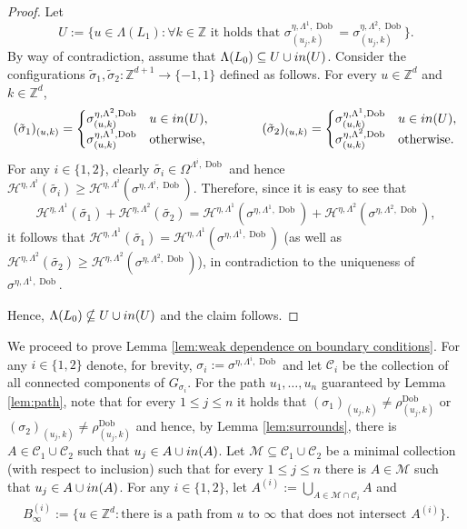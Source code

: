 \documentclass[11pt, reqno]{amsart}
\newcommand{\Z}{\mathbb{Z}}
\DeclareMathOperator{\Dob}{Dob}
\numberwithin{equation}{section}
\begin{document}
\begin{proof}
Let $$U:=\{u\in\Lambda(L_1)\colon\forall k\in{\mathbb Z} \text{ it holds that } \sigma^{\eta,\Lambda^1,\Dob}_{(u_j,k)} =\sigma^{\eta,\Lambda^2,\Dob}_{(u_j,k)}\}.$$
By way of contradiction, assume that $\Lambda(L_0)\subseteq U\cup{\rm in}(U)$.
Consider the configurations $\tilde{\sigma}_1,\tilde{\sigma}_2\colon{\mathbb Z}^{d+1}\to\{-1,1\}$ defined as follows. For every $u\in{\mathbb Z}^d$ and $k\in{\mathbb Z}^d$,
$$
(\tilde{\sigma}_1)_{(u,k)}=\begin{cases}
\sigma^{\eta,\Lambda^2,\Dob}_{(u,k)} & u\in {\rm in}(U),\\
\sigma^{\eta,\Lambda^1,\Dob}_{(u,k)} & \text{otherwise},\end{cases}
\qquad\qquad (\tilde{\sigma}_2)_{(u,k)}=\begin{cases}
\sigma^{\eta,\Lambda^1,\Dob}_{(u,k)} & u\in {\rm in}(U),\\
\sigma^{\eta,\Lambda^2,\Dob}_{(u,k)} & \text{otherwise}.\end{cases}
$$
For any $i\in\{1,2\}$, clearly $\tilde{\sigma_i}\in\Omega^{\Lambda^i,\Dob}$ and hence $\mathcal{H}^{\eta,\Lambda^i}(\tilde{\sigma_i})\geq \mathcal{H}^{\eta,\Lambda^i}(\sigma^{\eta,\Lambda^i,\Dob})$.
Therefore, since it is easy to see that
$$
\mathcal{H}^{\eta,\Lambda^1}(\tilde{\sigma_1})+ \mathcal{H}^{\eta,\Lambda^2}(\tilde{\sigma_2})
=\mathcal{H}^{\eta,\Lambda^1}(\sigma^{\eta,\Lambda^1,\Dob})+ \mathcal{H}^{\eta,\Lambda^2}(\sigma^{\eta,\Lambda^2,\Dob}),
$$
it follows that $\mathcal{H}^{\eta,\Lambda^1}(\tilde{\sigma_1})= \mathcal{H}^{\eta,\Lambda^1}(\sigma^{\eta,\Lambda^1,\Dob})$ (as well as $\mathcal{H}^{\eta,\Lambda^2}(\tilde{\sigma_2})\geq \mathcal{H}^{\eta,\Lambda^2}(\sigma^{\eta,\Lambda^2,\Dob})$),
in contradiction to the uniqueness of $\sigma^{\eta,\Lambda^1,\Dob}$.

Hence, $\Lambda(L_0)\nsubseteq U\cup{\rm in}(U)$ and the claim follows.
\end{proof}

We proceed to prove Lemma \ref{lem:weak dependence on boundary conditions}.
For any $i\in\{1,2\}$ denote, for brevity, $\sigma_i:=\sigma^{\eta,\Lambda^i, \Dob}$ and let $\mathcal{C}_i$
be the collection of all connected components of $G_{\sigma_i}$. 
For the path $u_1,\dots,u_n$ guaranteed by Lemma \ref{lem:path}, note that for every $1\leq j\leq n$ it holds that $(\sigma_1)_{(u_j,k)} \neq \rho^{\Dob}_{(u_j,k)}$ or $(\sigma_2)_{(u_j,k)} \neq \rho^{\Dob}_{(u_j,k)}$ and hence, by Lemma \ref{lem:surrounds}, there is $A\in\mathcal{C}_1\cup\mathcal{C}_2$ 
such that $u_j\in A\cup{\rm in}(A)$.
Let $\mathcal{M}\subseteq\mathcal{C}_1\cup\mathcal{C}_2$ be a minimal collection (with respect to inclusion) such that for every $1\leq j\leq n$ there is $A\in\mathcal{M}$ such that $u_j\in A\cup{\rm in}(A)$.
For any $i\in\{1,2\}$, let 
$A^{(i)}:=\bigcup_{A\in\mathcal{M}\cap\mathcal{C}_i}A$
and
\begin{align*}
B^{(i)}_{\infty}:= \{u\in \Z^{d}: \text{there is a path from } u \text{ to } \infty \text{ that does not intersect } A^{(i)} \}.
\end{align*}
\end{document}
